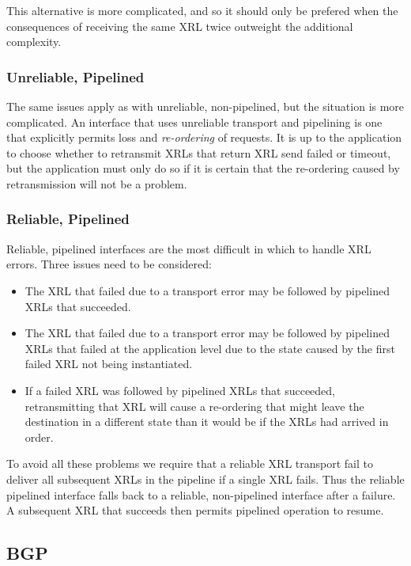 \documentclass[11pt]{article}
\begin{document}
This alternative is more complicated, and so it should only be
prefered when the consequences of receiving the same XRL twice
outweight the additional complexity.

\subsubsection*{Unreliable, Pipelined}

The same issues apply as with unreliable, non-pipelined, but the
situation is more complicated.  An interface that uses unreliable
transport and pipelining is one that explicitly permits loss and {\em
re-ordering} of requests.  It is up to the application to choose
whether to retransmit XRLs that return XRL send failed or timeout, but
the application must only do so if it is certain that the re-ordering
caused by retransmission will not be a problem.

\subsubsection*{Reliable, Pipelined}

Reliable, pipelined interfaces are the most difficult in which to
handle XRL errors.  Three issues need to be considered:
\begin{itemize}
\item The XRL that failed due to a transport error may be followed by
pipelined XRLs that succeeded.
\item The XRL that failed due to a transport error may be followed by
pipelined XRLs that failed at the application level due to the state
caused by the first failed XRL not being instantiated.
\item If a failed XRL was followed by pipelined XRLs that succeeded,
retransmitting that XRL will cause a re-ordering that might leave the
destination in a different state than it would be if the XRLs had
arrived in order.
\end{itemize}
To avoid all these problems we require that a reliable XRL transport
fail to deliver all subsequent XRLs in the pipeline if a single XRL
fails.  Thus the reliable pipelined interface falls back to a
reliable, non-pipelined interface after a failure.  A subsequent XRL
that succeeds then permits pipelined operation to resume.

\subsection{BGP}
\end{document}
